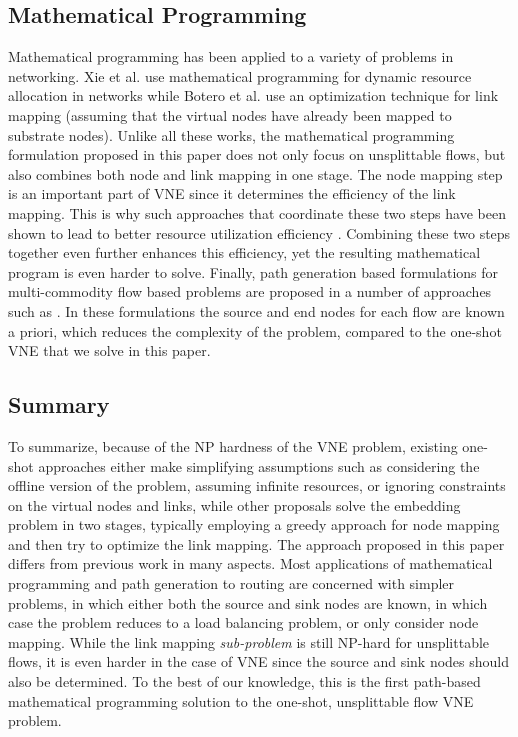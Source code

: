 \documentclass[journal]{IEEEtran}
\begin{document}
\subsection{Mathematical Programming}
Mathematical programming has been applied to a variety of problems in networking. Xie et al. \cite{Xie12} use mathematical programming for dynamic resource allocation in networks while Botero et al. \cite{Botero12} use an optimization technique for link mapping (assuming that the virtual nodes have already been mapped to substrate nodes). Unlike all these works, the mathematical programming formulation proposed in this paper does not only focus on unsplittable flows, but also combines both node and link mapping in one stage. The node mapping step is an important part of VNE since it determines the efficiency of the link mapping. This is why such approaches that coordinate these two steps have been shown to lead to better resource utilization efficiency \cite{Chowdhury12}. Combining these two steps together even further enhances this efficiency, yet the resulting mathematical program is even harder to solve. Finally, path generation based formulations for multi-commodity flow based problems are proposed in a number of approaches such as \cite{Santos10}. In these formulations the source and end nodes for each flow are known a priori, which reduces the complexity of the problem, compared to the one-shot \ac{VNE} that we solve in this paper.
\subsection{Summary}
To summarize, because of the NP hardness of the \ac{VNE} problem, existing one-shot approaches either make simplifying assumptions such as considering the offline version of the problem, assuming infinite resources, or ignoring constraints on the virtual nodes and links, while other proposals solve the embedding problem in two stages, typically employing a greedy approach for node mapping and then try to optimize the link mapping. The approach proposed in this paper differs from previous work in many aspects. Most applications of mathematical programming and path generation to routing are concerned with simpler problems, in which either both the source and sink nodes are known, in which case the problem reduces to a load balancing problem, or only consider node mapping. While the link mapping \emph{sub-problem} is still NP-hard for unsplittable flows, it is even harder in the case of \ac{VNE} since the source and sink nodes should also be determined. To the best of our knowledge, this is the first path-based mathematical programming solution to the one-shot, unsplittable flow \ac{VNE} problem.
\end{document}
